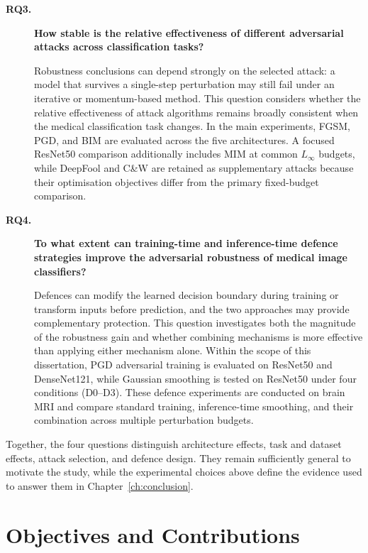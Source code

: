 \documentclass[12pt,a4paper,oneside]{report}
\begin{document}
\begin{description}
  \item[\textbf{RQ3.}] \textbf{How stable is the relative effectiveness of different adversarial attacks across classification tasks?}

  Robustness conclusions can depend strongly on the selected attack: a model that survives a single-step perturbation may still fail under an iterative or momentum-based method. This question considers whether the relative effectiveness of attack algorithms remains broadly consistent when the medical classification task changes. In the main experiments, FGSM, PGD, and BIM are evaluated across the five architectures. A focused ResNet50 comparison additionally includes MIM at common $L_\infty$ budgets, while DeepFool and C\&W are retained as supplementary attacks because their optimisation objectives differ from the primary fixed-budget comparison.

  \item[\textbf{RQ4.}] \textbf{To what extent can training-time and inference-time defence strategies improve the adversarial robustness of medical image classifiers?}

  Defences can modify the learned decision boundary during training or transform inputs before prediction, and the two approaches may provide complementary protection. This question investigates both the magnitude of the robustness gain and whether combining mechanisms is more effective than applying either mechanism alone. Within the scope of this dissertation, PGD adversarial training is evaluated on ResNet50 and DenseNet121, while Gaussian smoothing is tested on ResNet50 under four conditions (D0--D3). These defence experiments are conducted on brain MRI and compare standard training, inference-time smoothing, and their combination across multiple perturbation budgets.
\end{description}

Together, the four questions distinguish architecture effects, task and dataset effects, attack selection, and defence design. They remain sufficiently general to motivate the study, while the experimental choices above define the evidence used to answer them in Chapter~\ref{ch:conclusion}.

\section{Objectives and Contributions}

\end{document}
